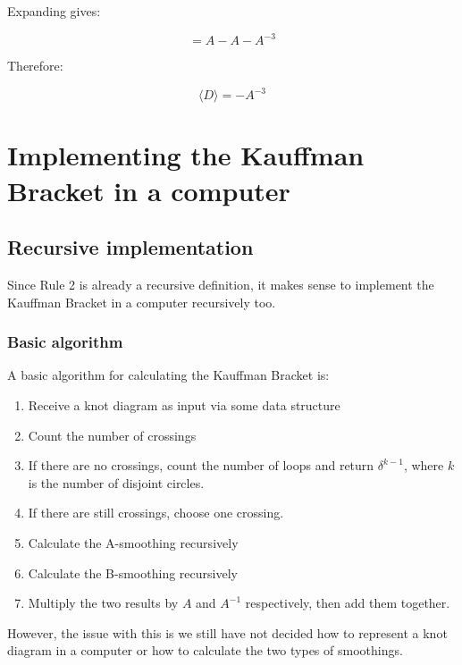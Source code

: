 \documentclass{article}
\begin{document}
Expanding gives:

\[
    = A - A - A^{-3}
\]

Therefore:

\[
    \langle D \rangle = -A^{-3}
\]

\section{Implementing the Kauffman Bracket in a computer}

\subsection{Recursive implementation}

Since Rule 2 is already a recursive definition, it makes sense to implement the Kauffman Bracket in a computer recursively too.

\subsubsection{Basic algorithm}

A basic algorithm for calculating the Kauffman Bracket is:

\begin{enumerate}
    \item Receive a knot diagram as input via some data structure
    \item Count the number of crossings
    \item If there are no crossings, count the number of loops and return $\delta^{k-1}$, where $k$ is the number of disjoint circles.
    \item If there are still crossings, choose one crossing.
    \item Calculate the A-smoothing recursively
    \item Calculate the B-smoothing recursively
    \item Multiply the two results by $A$ and $A^{-1}$ respectively, then add them together.
\end{enumerate}

However, the issue with this is we still have not decided how to represent a knot diagram in a computer or how to calculate the two types of smoothings.
\end{document}
